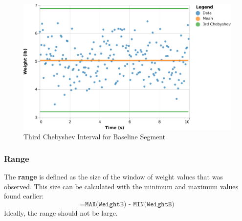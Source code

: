 \begin{figure}
    \centering
    \includegraphics{chart/00-intro/baseline-chebyshev-3.pdf}
    \caption{Third Chebyshev Interval for Baseline Segment}
    \label{figure:00.baseline.chebyshev.3}
\end{figure}
\subsubsection{Range}
The \textbf{range} is defined as the size of the window of weight values that was observed. This size can be calculated with the minimum and maximum values found earlier:
\begin{equation}
    \texttt{=MAX(WeightB) - MIN(WeightB)}
\end{equation}
Ideally, the range should not be large.
